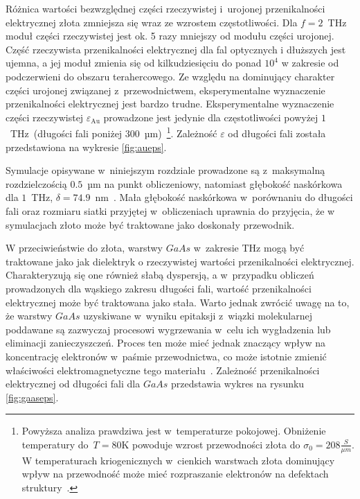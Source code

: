 Różnica wartości bezwzględnej części rzeczywistej i~urojonej przenikalności elektrycznej złota zmniejsza się wraz ze wzrostem częstotliwości. Dla $f=2$~THz moduł części rzeczywistej jest ok. 5 razy mniejszy od modułu części urojonej. Część rzeczywista przenikalności elektrycznej dla fal optycznych i dłuższych jest ujemna, a jej moduł zmienia się od kilkudziesięciu do ponad $10^4$ w zakresie od podczerwieni do obszaru terahercowego. Ze względu na dominujący charakter części urojonej związanej z~przewodnictwem, eksperymentalne wyznaczenie przenikalności elektrycznej jest bardzo trudne. Eksperymentalne wyznaczenie części rzeczywistej $\varepsilon_{\textrm{Au}}$ prowadzone jest jedynie dla częstotliwości powyżej $1$~THz~(długości fali poniżej  $300$~µm)~\cite{ordal1983optical}\footnote{Powyższa analiza prawdziwa jest w~temperaturze pokojowej. Obniżenie temperatury do~$T=$80K powoduje wzrost przewodności złota do $\sigma_0=208\frac{S}{\mu m}$. W temperaturach kriogenicznych w~cienkich warstwach złota dominujący wpływ na przewodność może mieć rozpraszanie elektronów na defektach struktury~\cite{lide2009crc}.}. Zależność $\varepsilon$ od długości fali została przedstawiona na wykresie \ref{fig:aueps}. 

Symulacje opisywane w~niniejszym rozdziale prowadzone są z~maksymalną rozdzielczością $0.5$~µm na punkt obliczeniowy, natomiast głębokość naskórkowa dla $1$~THz, $\delta=74.9$~nm~\cite{lee2009principles}. Mała głębokość naskórkowa w~porównaniu do długości fali oraz rozmiaru siatki przyjętej w~obliczeniach uprawnia do przyjęcia, że w symulacjach złoto może być traktowane jako doskonały przewodnik. 

W przeciwieństwie do złota, warstwy $GaAs$ w~zakresie THz mogą być traktowane jako jak dielektryk o rzeczywistej wartości przenikalności elektrycznej. Charakteryzują się one również słabą dyspersją, a w~przypadku obliczeń prowadzonych dla wąskiego zakresu długości fali, wartość przenikalności elektrycznej może być traktowana jako stała. Warto jednak zwrócić uwagę na to, że warstwy $GaAs$ uzyskiwane w~wyniku epitaksji z~wiązki molekularnej poddawane są zazwyczaj procesowi wygrzewania w~celu ich wygładzenia lub eliminacji zanieczyszczeń. Proces ten może mieć jednak znaczący wpływ na koncentrację elektronów w~paśmie przewodnictwa, co może istotnie zmienić właściwości elektromagnetyczne tego materiału~\cite{zhang2009annealing}. Zależność przenikalności elektrycznej od długości fali dla $GaAs$ przedstawia wykres na rysunku \ref{fig:gaaseps}.
